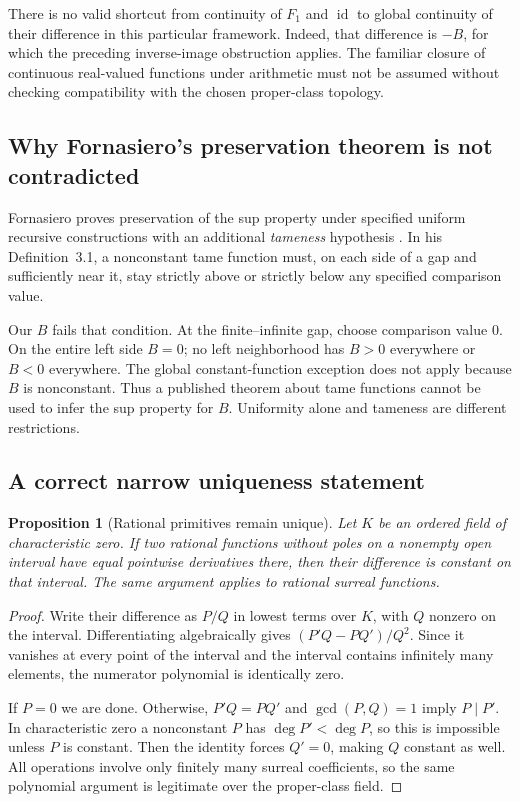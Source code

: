\documentclass[11pt,letterpaper]{article}
\numberwithin{equation}{section}
\newtheorem{proposition}[theorem]{Proposition}
\theoremstyle{definition}
\theoremstyle{remark}
\newcommand{\id}{\operatorname{id}}
\newcommand{\source}[2]{\cite[#1]{#2}}
\begin{document}
There is no valid shortcut from continuity of $F_1$ and $\id$ to global
continuity of their difference in this particular framework. Indeed,
that difference is $-B$, for which the preceding inverse-image obstruction
applies. The familiar closure of continuous real-valued functions under
arithmetic must not be assumed without checking compatibility with the
chosen proper-class topology.

\subsection{Why Fornasiero's preservation theorem is not contradicted}
Fornasiero proves preservation of the sup property under specified uniform
recursive constructions with an additional \emph{tameness} hypothesis
\source{Theorem~3}{Fornasiero}. In his Definition~3.1, a nonconstant tame
function must, on each side of a gap and sufficiently near it, stay
strictly above or strictly below any specified comparison value.

Our $B$ fails that condition. At the finite--infinite gap, choose comparison
value $0$. On the entire left side $B=0$; no left neighborhood has
$B>0$ everywhere or $B<0$ everywhere. The global constant-function exception
does not apply because $B$ is nonconstant. Thus a published theorem about
tame functions cannot be used to infer the sup property for $B$.
Uniformity alone and tameness are different restrictions.

\subsection{A correct narrow uniqueness statement}
\begin{proposition}[Rational primitives remain unique]\label{prop:rational}
Let $K$ be an ordered field of characteristic zero. If two rational
functions without poles on a nonempty open interval have equal pointwise
derivatives there, then their difference is constant on that interval.
The same argument applies to rational surreal functions.
\end{proposition}
\begin{proof}
Write their difference as $P/Q$ in lowest terms over $K$, with $Q$ nonzero
on the interval. Differentiating algebraically gives
$(P'Q-PQ')/Q^2$. Since it vanishes at every point of the interval and the
interval contains infinitely many elements, the numerator polynomial is
identically zero.

If $P=0$ we are done. Otherwise, $P'Q=PQ'$ and $\gcd(P,Q)=1$ imply
$P\mid P'$. In characteristic zero a nonconstant $P$ has
$\deg P'<\deg P$, so this is impossible unless $P$ is constant.
Then the identity forces $Q'=0$, making $Q$ constant as well.
All operations involve only finitely many surreal coefficients, so the
same polynomial argument is legitimate over the proper-class field.
\end{proof}
\end{document}
